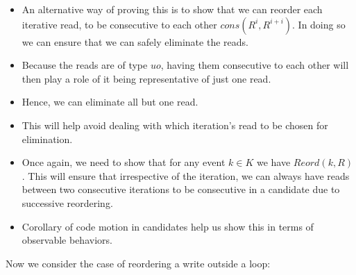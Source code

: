             \begin{itemize}
                \item An alternative way of proving this is to show that we can reorder each iterative read, to be consecutive to each other $cons(R^i, R^{i+i})$. In doing so we can ensure that we can safely eliminate the reads. 
                \item Because the reads are of type $uo$, having them consecutive to each other will then play a role of it being representative of just one read. 
                \item Hence, we can eliminate all but one read. 
                \item This will help avoid dealing with which iteration's read to be chosen for elimination. 
                \item Once again, we need to show that for any event $k \in K$ we have $Reord(k, R)$. This will ensure that irrespective of the iteration, we can always have reads between two consecutive iterations to be consecutive in a candidate due to successive reordering.
                \item Corollary of code motion in candidates help us show this in terms of observable behaviors.
            \end{itemize}

            Now we consider the case of reordering a write outside a loop:
             
